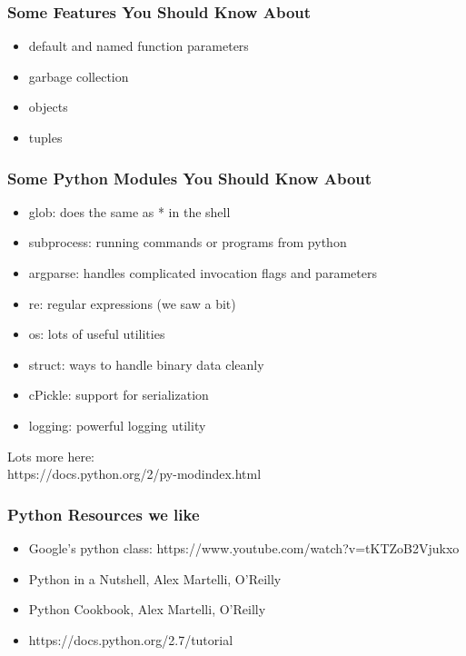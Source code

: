 \documentclass[10pt]{beamer}
\begin{document}
\begin{frame}[fragile]
\frametitle{Some Features You Should Know About}

\begin{itemize}
\item default and named function parameters
\item garbage collection
\item objects
\item tuples
\end{itemize}

\end{frame}

\begin{frame}[fragile]
\frametitle{Some Python Modules You Should Know About}

\begin{itemize}
\item glob: does the same as * in the shell
\item subprocess: running commands or programs from python
\item argparse: handles complicated invocation flags and parameters
\item re: regular expressions (we saw a bit)
\item os: lots of useful utilities
\item struct: ways to handle binary data cleanly
\item cPickle: support for serialization
\item logging: powerful logging utility
\end{itemize}

\vspace{5mm}
Lots more here:\\
https://docs.python.org/2/py-modindex.html

\end{frame}

\begin{frame}[fragile]
\frametitle{Python Resources we like}

\begin{itemize}
\item Google's python class: https://www.youtube.com/watch?v=tKTZoB2Vjukxo
\item Python in a Nutshell, Alex Martelli, O'Reilly
\item Python Cookbook, Alex Martelli, O'Reilly
\item https://docs.python.org/2.7/tutorial
\end{itemize}

\end{frame}
\end{document}
